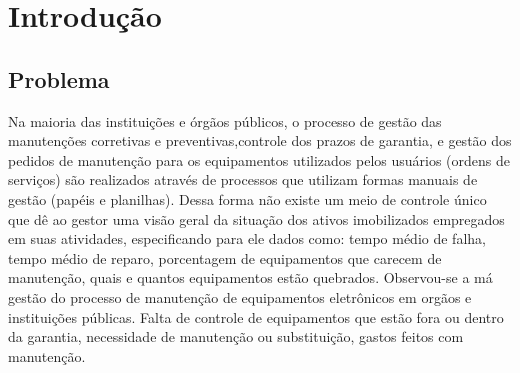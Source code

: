 \chapter{Introdução}
\label{cap-introducao}




%



\section{Problema}

Na maioria das instituições e órgãos públicos, o processo de gestão das manutenções corretivas e preventivas,controle dos prazos de garantia, e gestão dos pedidos de manutenção para os equipamentos utilizados pelos usuários (ordens de serviços) são realizados através de processos que utilizam formas manuais de gestão (papéis e planilhas). Dessa forma não existe um meio de controle único que dê ao gestor uma visão geral da situação dos ativos imobilizados empregados em suas atividades, especificando para ele dados como: tempo médio de falha, tempo médio de reparo, porcentagem de equipamentos que carecem de manutenção, quais e quantos equipamentos estão quebrados.
%
Observou-se a má gestão do processo de manutenção de equipamentos eletrônicos em orgãos e instituições públicas. Falta de controle de equipamentos que estão fora ou dentro da garantia, necessidade de manutenção ou substituição, gastos feitos com manutenção.

